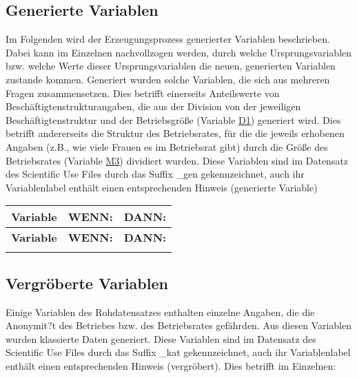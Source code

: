 \subsection{Generierte Variablen}\label{var_generiert} 

Im Folgenden wird der Erzeugungsprozess generierter Variablen beschrieben. Dabei kann im Einzelnen
nachvollzogen werden, durch welche Ursprungsvariablen bzw. welche Werte dieser Ursprungsvariablen die neuen, generierten
Variablen zustande kommen. Generiert wurden solche Variablen, die sich aus mehreren Fragen zusammensetzen. Dies betrifft einerseits Anteilswerte von Beschäftigtenstrukturangaben, die aus der Division von  der jeweiligen Beschäftigtenstruktur und der Betriebsgröße (Variable \hyperref[var:D1]{D1}) generiert wird. Dies betrifft andererseits die Struktur des Betriebsrates, für die die jeweils erhobenen Angaben (z.B., wie viele Frauen es im Betriebsrat gibt) durch die Größe des Betriebsrates (Variable \hyperref[var:M3]{M3}) dividiert wurden. Diese Variablen sind im Datensatz des Scientific Use Files durch das Suffix \glqq \_gen \grqq\xspace gekennzeichnet, auch ihr Variablenlabel enthält einen entsprechenden Hinweis (\grqq generierte Variable\grqq )

\begin{longtable}{!{\color{black}\vline width 1pt} L{2.5cm} !{\color{black}\vline width 1pt} L{9.125cm} | L{5.125cm} !{\color{black}\vline width 1pt}  }
	
	\toprule
		\textbf{Variable} & \textbf{WENN:} & \textbf{DANN:}  \\ 
	\midrule
	\endfirsthead
	
	\toprule
		\textbf{Variable} & \textbf{WENN:} & \textbf{DANN:}  \\ 
	\midrule
	\endhead
	
	\midrule
	
	\endfoot
	\bottomrule
	\endlastfoot
		
	
	
\end{longtable}

\subsection{Vergröberte Variablen}\label{var_kategorisiert}

Einige Variablen des Rohdatensatzes enthalten einzelne Angaben, die die Anonymit?t des Betriebes bzw. des Betriebsrates gefährden. Aus diesen Variablen wurden klassierte Daten generiert. Diese Variablen sind im Datensatz des Scientific Use Files durch das Suffix \glqq \_kat \grqq\xspace gekennzeichnet, auch ihr Variablenlabel enthält einen entsprechenden Hinweis (\grqq vergröbert\grqq ). Dies betrifft im Einzelnen:

